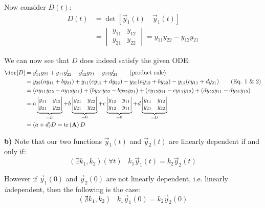 \documentclass{article}
\begin{document}
Now consider $D(t)$:
\begin{align*}
  D(t)&=\det[\vec y_1(t)\quad\vec y_1(t)]\\
  &=\begin{vmatrix}
    y_{11}&y_{12}\\y_{21}&y_{22}
  \end{vmatrix}=y_{11}y_{22}-y_{12}y_{21}
\end{align*}

We can now see that $D$ does indeed satisfy the given ODE:
\begin{align*}
  \der[D]&=y_{11}'y_{22}+y_{11}y_{22}'-y_{12}'y_{21}-y_{12}y_{21}'\tag{product rule}\\
  &=y_{22}(ay_{11}+by_{21})+y_{11}(cy_{12}+dy_{22})-y_{21}(ay_{12}+by_{22})-y_{12}(cy_{11}+dy_{21})\tag{Eq. 1 \& 2}\\
  &=(ay_{11}y_{22}-ay_{12}y_{21})+(by_{21}y_{22}-by_{22}y_{21})+(cy_{12}y_{11}-cy_{11}y_{12})+(dy_{22}y_{11}-dy_{21}y_{12})\\
  &=a\underbrace{\begin{vmatrix}y_{11}&y_{12}\\y_{21}&y_{22}\end{vmatrix}}_{=D}+b\underbrace{\begin{vmatrix}y_{21}&y_{22}\\y_{21}&y_{22}\end{vmatrix}}_{=0}+c\underbrace{\begin{vmatrix}y_{12}&y_{11}\\y_{12}&y_{11}\end{vmatrix}}_{=0}+d\underbrace{\begin{vmatrix}y_{11}&y_{12}\\y_{21}&y_{22}\end{vmatrix}}_{=D}\\
  &=(a+d)D=\tr{\vec A}D
\end{align*}


\textbf{b)} Note that our two functions $\vec y_1(t)$ and $\vec y_2(t)$ are linearly dependent if and only if:
\begin{equation*}
  (\exists k_1,k_2)(\forall t)\,\,\,\,\,k_1\vec y_1(t)=k_2\vec y_2(t)\tag{*}
\end{equation*}

However if $\vec y_1(0)$ and $\vec y_2(0)$ are not linearly dependent, i.e. linearly \textit{in}dependent, then the following is the case:
\begin{equation*}
  (\nexists k_1,k_2)\,\,\,\,\,k_1\vec y_1(0)=k_2\vec y_2(0)
\end{equation*}
\end{document}
